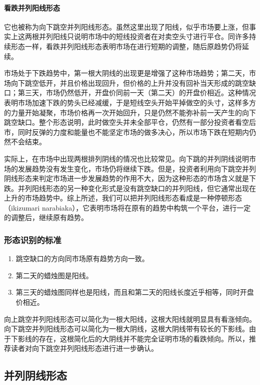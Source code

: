 
\paragraph{看跌并列阳线形态} 它也被称为向下跳空并列阳线形态。虽然这里出现了阳线，似乎市场要上涨，但事实上这两根并列阳线只说明市场中的短线投资者在对卖空头寸进行平仓。同许多持续形态一样，看跌并列阳线形态表明市场在进行短期的调整，随后原趋势仍将延续。

市场处于下跌趋势中，第一根大阴线的出现更是增强了这种市场趋势；第二天，市场向下跳空低开，并且价格出现回升，但价格的上升并没有回补当天形成的跳空缺口；第三天，市场仍然低开，开盘价同前一天（第二天）的开盘价相近。这种情况表明市场加速下跌的势头已经减缓，于是短线空头开始平掉做空的头寸，这样多方的力量开始凝聚，市场价格再一次开始回升，只是仍然不能弥补前一天产生的向下跳空缺口。整个形态说明，此时做空头并未全部平仓，仍然有一部分投资者看空后市，同时反弹的力度和能量也不能坚定市场的做多决心，所以市场下跌在短期内仍然不会结束。



实际上，在市场中出现两根排列阴线的情况也比较常见。向下跳的并列阴线说明市场的发展趋势没有发生变化，市场仍将继续下跌。但是，投资者利用向下跳空并列阴线形态来判定市场进一步发展趋势的作用不大，因为这种形态的市场含义就是下跌。并列阳线形态的另一种变化形式是没有跳空缺口的并列阳线，但它通常出现在上升的市场趋势中。综上所述，我们可以把并列阳线形态看成是一种停顿形态（ikizumari narabiaka），它表明市场将在原有的趋势中构筑一个平台，进行一定的调整后，继续原有趋势。
\subsubsection*{形态识别的标准}
\begin{enumerate}
    \item 跳空缺口的方向同市场原有趋势方向一致。
    \item 第二天的蜡烛图是阳线。
    \item 第三天的蜡烛图同样也是阳线，而且和第二天的阳线长度近乎相等，同时开盘价相近。
\end{enumerate}

向上跳空并列阳线形态可以简化为一根大阳线，这根大阳线就明显具有看涨倾向。向下跳空并列阳线形态可以简化为一根大阴线，这根大阴线带有较长的下影线。由于下影线的存在，这根简化后的大阴线并不能完全证明市场的看跌倾向。所以，推荐读者对向下跳空并列阳线形态进行进一步确认。
\subsection{并列阴线形态}
